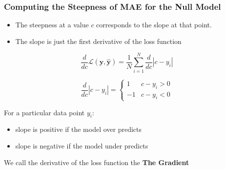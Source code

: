 \documentclass{beamer}
\begin{document}
\begin{frame}
\frametitle{Computing the Steepness of MAE for the Null Model}

\begin{itemize}
\item The steepness at a value $c$ corresponds to the slope at that point. 
\item The slope is just the first derivative of the loss function
\end{itemize}

\[
\frac{d}{dc}\mathcal{L}(\mathbf{y},\hat{\mathbf{y}})=\frac{1}{N}\sum_{i=1}^{N}\frac{d}{dc}\left|c-y_{i}\right|
\]

\[
\frac{d}{dc}\left|c-y_{i}\right|=\begin{cases}
1 & c-y_{i}>0\\
-1 & c-y_{i}<0
\end{cases}
\]

For a particular data point $y_i$:
\begin{itemize}
\item slope is positive if the model over predicts
\item slope is negative if the model under predicts
\end{itemize}

We call the derivative of the loss function the \textbf{The Gradient}
\end{frame}
\end{document}

